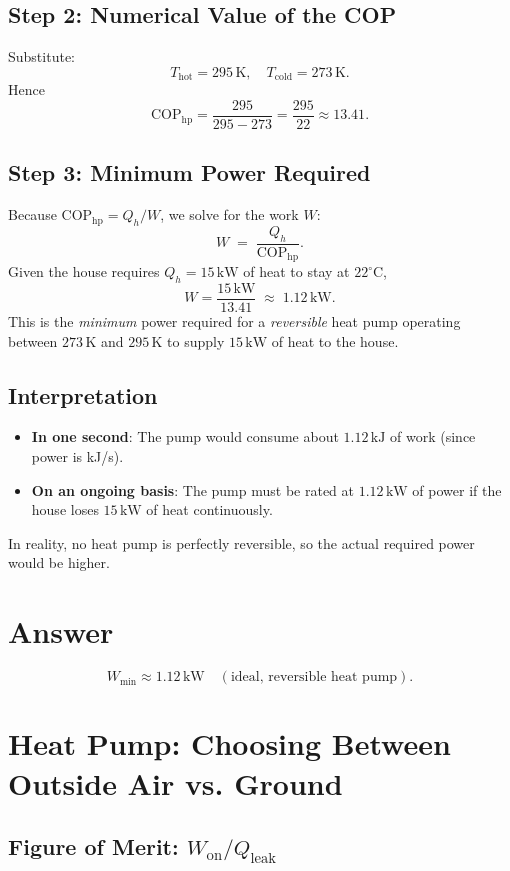 \documentclass[12pt]{article}
\theoremstyle{definition} %
\theoremstyle{plain} %
\begin{document}
\subsection*{Step 2: Numerical Value of the COP}
Substitute:
\[
T_{\text{hot}} = 295\,\mathrm{K}, 
\quad
T_{\text{cold}} = 273\,\mathrm{K}.
\]
Hence
\[
\mathrm{COP}_{\text{hp}}
= \frac{295}{295 - 273}
= \frac{295}{22}
\approx 13.41.
\]

\subsection*{Step 3: Minimum Power Required}
Because $\mathrm{COP}_{\text{hp}} = Q_h / W$, we solve for the work $W$:
\[
W \;=\; \frac{Q_h}{\mathrm{COP}_{\text{hp}}}.
\]
Given the house requires $Q_h = 15\,\mathrm{kW}$ of heat to stay at $22^\circ\mathrm{C}$,
\[
W 
= \frac{15\,\mathrm{kW}}{13.41}
\;\approx\; 1.12\,\mathrm{kW}.
\]
This is the \emph{minimum} power required for a \emph{reversible} heat pump operating between $273\,\mathrm{K}$ and $295\,\mathrm{K}$ to supply $15\,\mathrm{kW}$ of heat to the house.

\subsection*{Interpretation}
\begin{itemize}
  \item \textbf{In one second}: The pump would consume about $1.12\,\mathrm{kJ}$ of work (since power is kJ/s).
  \item \textbf{On an ongoing basis}: The pump must be rated at $1.12\,\mathrm{kW}$ of power if the house loses $15\,\mathrm{kW}$ of heat continuously.
\end{itemize}
In reality, no heat pump is perfectly reversible, so the actual required power would be higher.

\section*{Answer}
\[
\boxed{W_{\min} \approx 1.12\,\mathrm{kW} \quad (\text{ideal, reversible heat pump}).}
\]

\section*{Heat Pump: Choosing Between Outside Air vs. Ground}

\subsection*{Figure of Merit: \texorpdfstring{$W_{\text{on}}/Q_{\text{leak}}$}{W on / Q leak}}
\end{document}
